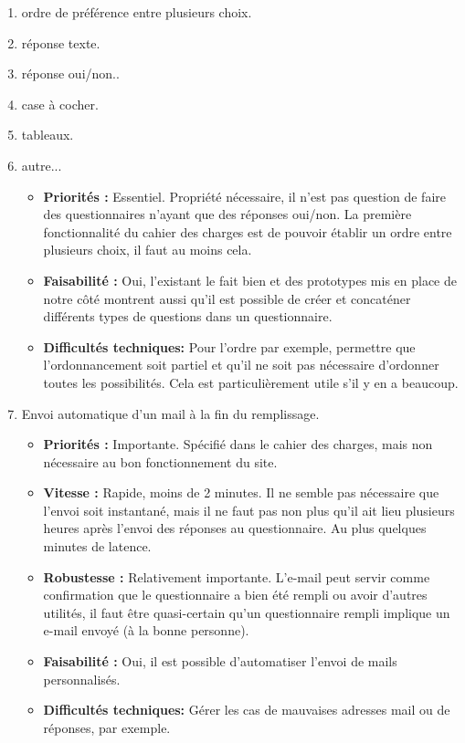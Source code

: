 \documentclass{article}
\begin{document}
\begin{enumerate}[noitemsep]
    \item ordre de préférence entre plusieurs choix.
    \item réponse texte.
    \item réponse oui/non..
    \item case à cocher.
    \item tableaux.
    \item autre...

\begin{itemize}[noitemsep]
    \item \textbf{Priorités : }Essentiel. Propriété nécessaire, il n'est pas question de faire des questionnaires n'ayant que des réponses oui/non. La première fonctionnalité du cahier des charges est de pouvoir établir un ordre entre plusieurs choix, il faut au moins cela.
    \item \textbf{Faisabilité : }Oui, l'existant le fait bien et des prototypes mis en place de notre côté montrent aussi qu'il est possible de créer et concaténer différents types de questions dans un questionnaire.
    \item \textbf{Difficultés techniques: }Pour l'ordre par exemple, permettre que l'ordonnancement soit partiel et qu'il ne soit pas nécessaire d'ordonner toutes les possibilités. Cela est particulièrement utile s'il y en a beaucoup.
\end{itemize}
\item Envoi automatique d'un mail à la fin du remplissage.
\begin{itemize}[noitemsep]
    \item \textbf{Priorités : }Importante. Spécifié dans le cahier des charges, mais non nécessaire au bon fonctionnement du site.
    \item \textbf{Vitesse : }Rapide, moins de 2 minutes. Il ne semble pas nécessaire que l'envoi soit instantané, mais il ne faut pas non plus qu'il ait lieu plusieurs heures après l'envoi des réponses au questionnaire. Au plus quelques minutes de latence.
    \item \textbf{Robustesse : }Relativement importante. L'e-mail peut servir comme confirmation que le questionnaire a bien été rempli ou avoir d'autres utilités, il faut être quasi-certain qu'un questionnaire rempli implique un e-mail envoyé (à la bonne personne).
    \item \textbf{Faisabilité : }Oui, il est possible d'automatiser l'envoi de mails personnalisés.
    \item \textbf{Difficultés techniques: } Gérer les cas de mauvaises adresses mail ou de réponses, par exemple.

\end{itemize}
\end{enumerate}
\end{document}
